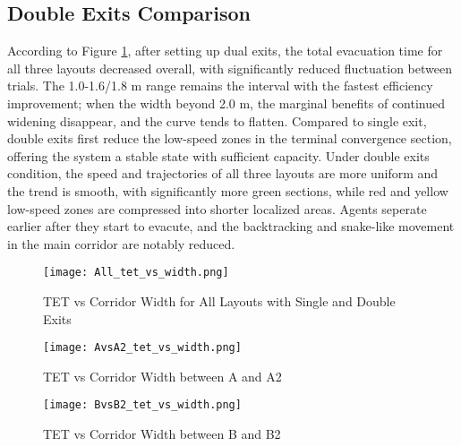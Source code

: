 \subsection{Double Exits Comparison}
According to Figure \ref{fig:all_tet_vs_width}, after setting up dual exits, the total evacuation time for all three layouts decreased overall, with significantly reduced fluctuation between trials. The 1.0-1.6/1.8 m range remains the interval with the fastest efficiency improvement; when the width beyond 2.0 m, the marginal benefits of continued widening disappear, and the curve tends to flatten. Compared to single exit, double exits first reduce the low-speed zones in the terminal convergence section, offering the system a stable state with sufficient capacity. Under double exits condition, the speed and trajectories of all three layouts are more uniform and the trend is smooth, with significantly more green sections, while red and yellow low-speed zones are compressed into shorter localized areas. Agents seperate earlier after they start to evacute, and the backtracking and snake-like movement in the main corridor are notably reduced.
\begin{figure}[h]
    \centering
    \texttt{[image: All\_tet\_vs\_width.png]}
    \caption{TET vs Corridor Width for All Layouts with Single and Double Exits}
    \label{fig:all_tet_vs_width}
\end{figure}

\begin{figure}[h]
    \texttt{[image: AvsA2\_tet\_vs\_width.png]}
    \caption{TET vs Corridor Width between A and A2}\label{fig:AvsA2_tet_vs_width}
\end{figure}

\begin{figure}[h]
    \texttt{[image: BvsB2\_tet\_vs\_width.png]}
    \caption{TET vs Corridor Width between B and B2}\label{fig:BvsB2_tet_vs_width}
\end{figure}

